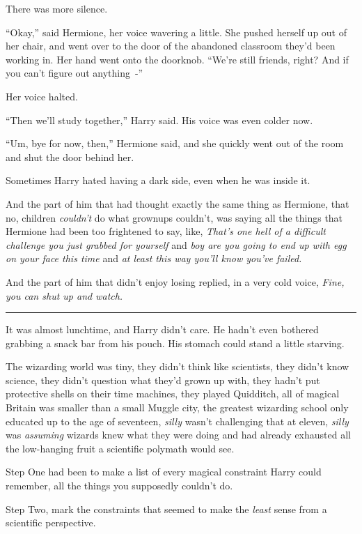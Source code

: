 There was more silence.

``Okay,'' said Hermione, her voice wavering a little. She pushed herself up out of her chair, and went over to the door of the abandoned classroom they'd been working in. Her hand went onto the doorknob. ``We're still friends, right? And if you can't figure out anything~-''

Her voice halted.

``Then we'll study together,'' Harry said. His voice was even colder now.

``Um, bye for now, then,'' Hermione said, and she quickly went out of the room and shut the door behind her.

Sometimes Harry hated having a dark side, even when he was inside it.

And the part of him that had thought exactly the same thing as Hermione, that no, children \emph{couldn't} do what grownups couldn't, was saying all the things that Hermione had been too frightened to say, like, \emph{That's one hell of a difficult challenge you just grabbed for yourself} and \emph{boy are you going to end up with egg on your face this time} and \emph{at least this way you'll know you've failed.}

And the part of him that didn't enjoy losing replied, in a very cold voice, \emph{Fine, you can shut up and watch.}

\begin{center}\rule{3in}{0.4pt}\end{center}

It was almost lunchtime, and Harry didn't care. He hadn't even bothered grabbing a snack bar from his pouch. His stomach could stand a little starving.

The wizarding world was tiny, they didn't think like scientists, they didn't know science, they didn't question what they'd grown up with, they hadn't put protective shells on their time machines, they played Quidditch, all of magical Britain was smaller than a small Muggle city, the greatest wizarding school only educated up to the age of seventeen, \emph{silly} wasn't challenging that at eleven, \emph{silly} was \emph{assuming} wizards knew what they were doing and had already exhausted all the low-hanging fruit a scientific polymath would see.

Step One had been to make a list of every magical constraint Harry could remember, all the things you supposedly couldn't do.

Step Two, mark the constraints that seemed to make the \emph{least} sense from a scientific perspective.

